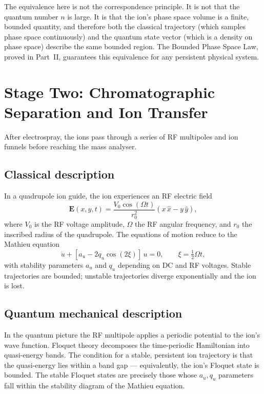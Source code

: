 \begin{remark}
  The equivalence here is not the correspondence principle.
  It is not that the quantum number $n$ is large.
  It is that the ion's phase space volume is a finite, bounded quantity, and
  therefore both the classical trajectory (which samples phase space
  continuously) and the quantum state vector (which is a density on phase
  space) describe the same bounded region.
  The Bounded Phase Space Law, proved in Part~II, guarantees this equivalence
  for any persistent physical system.
\end{remark}

\section{Stage Two: Chromatographic Separation and Ion Transfer}
\label{sec:ch1-chrom}

After electrospray, the ions pass through a series of RF multipoles and
ion funnels before reaching the mass analyser.

\subsection*{Classical description}
In a quadrupole ion guide, the ion experiences an RF electric field
\begin{equation}
  \mathbf{E}(x,y,t) = \frac{V_0 \cos(\Omega t)}{r_0^2}(x\,\hat{x} - y\,\hat{y}),
\end{equation}
where $V_0$ is the RF voltage amplitude, $\Omega$ the RF angular frequency,
and $r_0$ the inscribed radius of the quadrupole.
The equations of motion reduce to the Mathieu equation
\begin{equation}
  \ddot{u} + [a_u - 2q_u \cos(2\xi)]\,u = 0,
  \qquad \xi = \tfrac{1}{2}\Omega t,
\end{equation}
with stability parameters $a_u$ and $q_u$ depending on DC and RF voltages.
Stable trajectories are bounded; unstable trajectories diverge exponentially
and the ion is lost.

\subsection*{Quantum mechanical description}
In the quantum picture the RF multipole applies a periodic potential to the
ion's wave function.
Floquet theory decomposes the time-periodic Hamiltonian into quasi-energy bands.
The condition for a stable, persistent ion trajectory is that the quasi-energy
lies within a band gap --- equivalently, the ion's Floquet state is bounded.
The stable Floquet states are precisely those whose $a_u, q_u$ parameters
fall within the stability diagram of the Mathieu equation.

